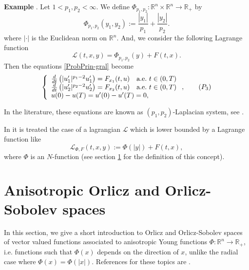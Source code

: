 \documentclass[twoside]{article}
\theoremstyle{remark}
\newcommand{\rr}{\mathbb{R}}
\newcounter{example}
\newenvironment{example}{\noindent\textbf{Example \arabic{example}}.}{\addtocounter{example}{1}}
\begin{document}
\begin{example}\label{ex:phip1p2} Let $1<p_1,p_2<\infty$. We define $\Phi_{p_1,p_2}:\rr^n\times \rr^n\to\rr_+$   by
\[\Phi_{p_1,p_2}(y_1,y_2):=\frac{|y_1|}{p_1}+\frac{|y_2|}{p_2}.\]
where $|\cdot|$ is the Euclidean norm on $\rr^n$.
And, we consider the following Lagrange function
\[\mathcal{L}(t,x,y)=\Phi_{p_1,p_2}(y)+F(t,x).\]
Then the equations \eqref{ProbPrin-gral} become
\begin{equation}\label{eq:sist-p_lapa}
    \left\{%
\begin{array}{ll}
  \frac{d}{dt}\left(|u_1'|^{p_1-2}u_1'\right)=F_{x_1}(t,u) \quad \hbox{a.e.}\ t \in (0,T)\\
  \frac{d}{dt}\left(|u_2'|^{p_2-2}u_2'\right)=F_{x_2}(t,u) \quad \hbox{a.e.}\ t \in (0,T)\\
   u(0)-u(T)=u'(0)-u'(T)=0,
\end{array}%
\right., \tag{$P_3$}
\end{equation}



\end{example}


In the literature, these equations are known as $(p_1,p_2)$-Laplacian system, see
\cite{yang2013existence,pasca2016periodic,yang2012periodic,pasca2010periodic,pacsca2010some,pasca2011some}.



In \cite{ABGMS2015} it is treated  the case of a lagrangian $\mathcal{L}$ which is lower bounded by a Lagrange function like
\begin{equation}\label{eq:lagrange_phi}
\mathcal{L}_{\Phi,F}(t,x,y):=\Phi(|y|)+F(t,x),
\end{equation}
where  $\Phi$ is an $N$-function (see section \ref{preliminares} for the definition of this concept).


\section{Anisotropic Orlicz and Orlicz-Sobolev spaces}\label{preliminares}

In this section, we give a short introduction to  Orlicz and Orlicz-Sobolev spaces of vector valued functions associated to anisotropic Young functions $\Phi:\rr^n\to\rr_+$, i.e. functions such that $\Phi(x)$ depends on the direction of $x$, unlike the radial case where $\Phi(x)=\Phi(|x|)$.  References for  these topics are \cite{Orliczvectorial2005,Skaff1969, Desch2001}.
\end{document}

